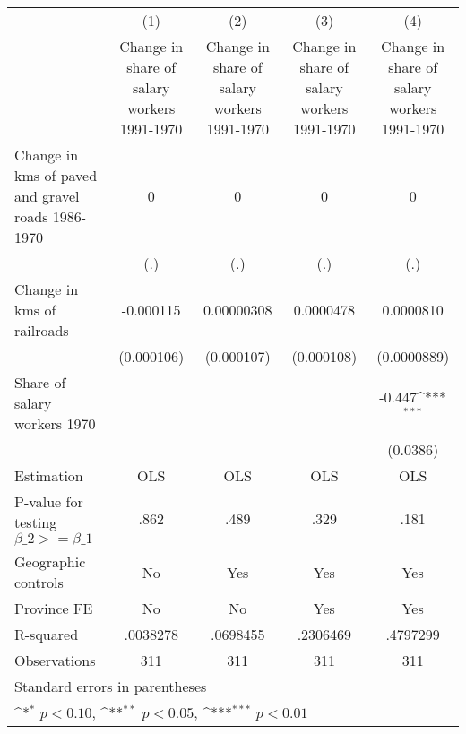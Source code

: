{
\def\sym#1{\ifmmode^{#1}\else\(^{#1}\)\fi}
\begin{tabular}{l*{4}{c}}
\hline\hline
                    &\multicolumn{1}{c}{(1)}&\multicolumn{1}{c}{(2)}&\multicolumn{1}{c}{(3)}&\multicolumn{1}{c}{(4)}\\
                    &\multicolumn{1}{c}{Change in share of salary workers 1991-1970}&\multicolumn{1}{c}{Change in share of salary workers 1991-1970}&\multicolumn{1}{c}{Change in share of salary workers 1991-1970}&\multicolumn{1}{c}{Change in share of salary workers 1991-1970}\\
\hline
Change in kms of paved and gravel roads 1986-1970&           0         &           0         &           0         &           0         \\
                    &         (.)         &         (.)         &         (.)         &         (.)         \\
[1em]
Change in kms of railroads&   -0.000115         &  0.00000308         &   0.0000478         &   0.0000810         \\
                    &  (0.000106)         &  (0.000107)         &  (0.000108)         & (0.0000889)         \\
[1em]
Share of salary workers 1970&                     &                     &                     &      -0.447\sym{***}\\
                    &                     &                     &                     &    (0.0386)         \\
\hline
Estimation          &         OLS         &         OLS         &         OLS         &         OLS         \\
P-value for testing $\beta\_2 >= \beta\_1$&        .862         &        .489         &        .329         &        .181         \\
Geographic controls &          No         &         Yes         &         Yes         &         Yes         \\
Province FE         &          No         &          No         &         Yes         &         Yes         \\
R-squared           &    .0038278         &    .0698455         &    .2306469         &    .4797299         \\
Observations        &         311         &         311         &         311         &         311         \\
\hline\hline
\multicolumn{5}{l}{\footnotesize Standard errors in parentheses}\\
\multicolumn{5}{l}{\footnotesize \sym{*} \(p<0.10\), \sym{**} \(p<0.05\), \sym{***} \(p<0.01\)}\\
\end{tabular}
}
